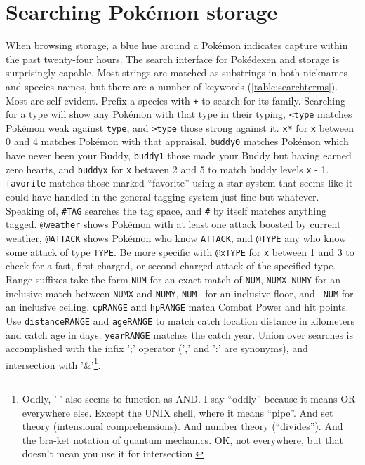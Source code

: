 \section{Searching Pokémon storage\label{sec:searching}}
When browsing storage, a blue hue around a Pokémon indicates capture within the past twenty-four hours.
The search interface for Pokédexen and storage is surprisingly capable.
Most strings are matched as substrings in both nicknames and species names,
 but there are a number of keywords (\autoref{table:searchterms}).
Most are self-evident.
Prefix a species with \texttt{+} to search for its family.
Searching for a type will show any Pokémon with that type in their typing,
 \texttt{<type} matches Pokémon weak against \texttt{type},
 and \texttt{>type} those strong against it.
\texttt{x*} for \texttt{x} between 0 and 4 matches Pokémon with that appraisal.
\texttt{buddy0} matches Pokémon which have never been your Buddy,
 \texttt{buddy1} those made your Buddy but having earned zero hearts,
 and \texttt{buddyx} for \texttt{x} between 2 and 5 to match buddy
 levels \texttt{x} - 1.
\texttt{favorite} matches those marked ``favorite'' using a star system that
 seems like it could have handled in the general tagging system just fine
 but whatever.
Speaking of, \texttt{\#TAG} searches the tag space, and \texttt{\#} by itself
 matches anything tagged.
\texttt{@weather} shows Pokémon with at least one attack boosted by current
 weather, \texttt{@ATTACK} shows Pokémon who know \texttt{ATTACK}, and \texttt{@TYPE}
 any who know some attack of type \texttt{TYPE}.
Be more specific with \texttt{@xTYPE} for \texttt{x} between 1 and 3 to check
  for a fast, first charged, or second charged attack of the specified type.
Range suffixes take the form \texttt{NUM} for an exact match of \texttt{NUM},
  \texttt{NUMX-NUMY} for an inclusive match between \texttt{NUMX} and \texttt{NUMY},
  \texttt{NUM-} for an inclusive floor,
  and \texttt{-NUM} for an inclusive ceiling.
\texttt{cpRANGE} and \texttt{hpRANGE} match Combat Power and hit points.
Use \texttt{distanceRANGE} and \texttt{ageRANGE} to match catch location
  distance in kilometers and catch age in days.
\texttt{yearRANGE} matches the catch year.
Union over searches is accomplished with the infix ';' operator (',' and ':' are synonyms),
  and intersection with '\&'\footnote{Oddly, '|' also seems to function as AND\@. I say ``oddly'' because it means OR everywhere else.
  Except the UNIX shell, where it means ``pipe''.
  And set theory (intensional comprehensions).
  And number theory (``divides'').
  And the bra-ket notation of quantum mechanics.
  OK, not everywhere, but that doesn't mean you use it for intersection.}.
